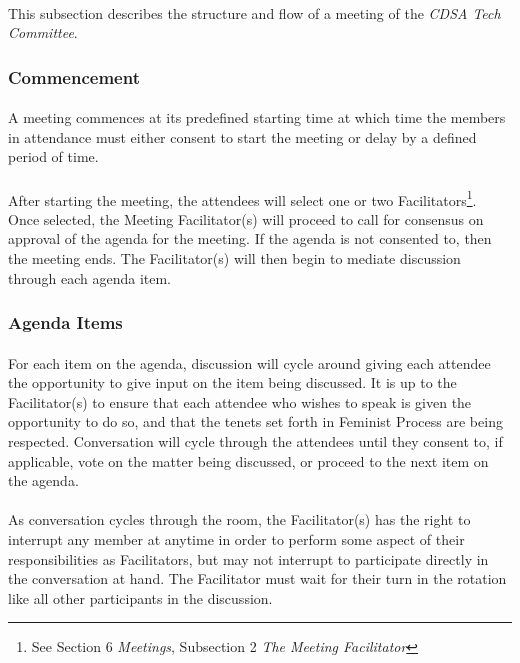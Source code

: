 \documentclass[12pt,letter,twocolumn,oneside,draft]{article}
\newcommand{\cname}{\emph{CDSA Tech Committee}}
\begin{document}
\paragraph{}
This subsection describes the structure and flow of a meeting of the \cname{}.

\subsubsection{Commencement}

\paragraph{}
A meeting commences at its predefined starting time at which time the members
in attendance must either consent to start the meeting or delay by a defined period of
time. 

\paragraph{}
After starting the meeting, the attendees will select one or two
Facilitators\footnote{See Section 6 \emph{Meetings}, Subsection 2 \emph{The
Meeting Facilitator}}. Once selected, the Meeting Facilitator(s) will proceed
to call for consensus on approval of the agenda for the meeting. If the agenda
is not consented to, then the meeting ends. The Facilitator(s) will then begin
to mediate discussion through each agenda item.

\subsubsection{Agenda Items}

\paragraph{}
For each item on the agenda, discussion will cycle around giving each attendee
the opportunity to give input on the item being discussed. It is up to the
Facilitator(s) to ensure that each attendee who wishes to speak is given the
opportunity to do so, and that the tenets set forth in Feminist Process are
being respected. Conversation will cycle through the attendees until they
consent to, if applicable, vote on the matter being discussed, or proceed to
the next item on the agenda.

\paragraph{}
As conversation cycles through the room, the Facilitator(s) has the right to
interrupt any member at anytime in order to perform some aspect of their
responsibilities as Facilitators, but may not interrupt to participate directly
in the conversation at hand. The Facilitator must wait for their turn in the
rotation like all other participants in the discussion.
\end{document}

